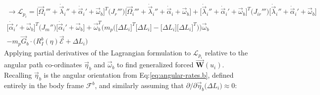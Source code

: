 \begin{multline}
\rightarrow\mathcal{L}_{p_i}=\Big[\vec{\Omega}_i'''+\dot{\vec{\lambda}}_i''+\dot{\vec{\alpha}}_i'+\vec{\omega}_b\Big]^T\big(J_r'''\big)\Big[\vec{\Omega}_i'''+\dot{\vec{\lambda}}_i''+\dot{\vec{\alpha}}_i+\vec{\omega}_b\Big]+\Big[\dot{\vec{\lambda}}_i''+\dot{\vec{\alpha}}_i'+\vec{\omega}_b\Big]^T\big(J_{ir}'''\big)\Big[\dot{\vec{\lambda}}_i''+\dot{\vec{\alpha}}_i'+\vec{\omega}_b\Big]
\\
\Big[\dot{\vec{\alpha}}_i'+\vec{\omega}_b\Big]^T\big(J_m''\big)\Big[\dot{\vec{\alpha}}_i'+\vec{\omega}_b\Big]+\vec{\omega}_{b}^T\big(m_p\Big(\big[\Delta L_i\big]^T\big[\Delta L_i\big]-\big[\Delta L_i\big]\big[\Delta L_i\big]^T\Big)\big)\vec{\omega}_{b}
\\
-m_p\vec{G}_b\cdot\big(R_I^b(\eta)\vec{\mathcal{E}}+\Delta L_i\big)
\end{multline}
Applying partial derivatives of the Lagrangian formulation to $\mathcal{L}_{p_i}$ relative to the angular path co-ordinates $\vec{\eta}_b$ and $\vec{\omega}_b$ to find generalized forced $\vec{\mathbf{W}}(u_i)$. Recalling $\vec{\eta}_b$ is the angular orientation from Eq:\ref{eq:angular-rates.b}, defined entirely in the body frame $\mathcal{F}^b$, and similarly assuming that $\partial/\partial\vec{\eta}_b\big(\Delta L_i\big)\approx 0$:
